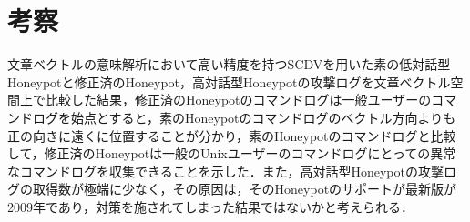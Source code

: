 \section{考察}
\label{eval:implkosatu}
文章ベクトルの意味解析において高い精度を持つ\cite{scdv}SCDVを用いた素の低対話型Honeypotと修正済のHoneypot，高対話型Honeypotの攻撃ログを文章ベクトル空間上で比較した結果，修正済のHoneypotのコマンドログは一般ユーザーのコマンドログを始点とすると，素のHoneypotのコマンドログのベクトル方向よりも正の向きに遠くに位置することが分かり，素のHoneypotのコマンドログと比較して，修正済のHoneypotは一般のUnixユーザーのコマンドログにとっての異常なコマンドログを収集できることを示した．また，高対話型Honeypotの攻撃ログの取得数が極端に少なく，その原因は，そのHoneypotのサポートが最新版が2009年であり，対策を施されてしまった結果ではないかと考えられる．





